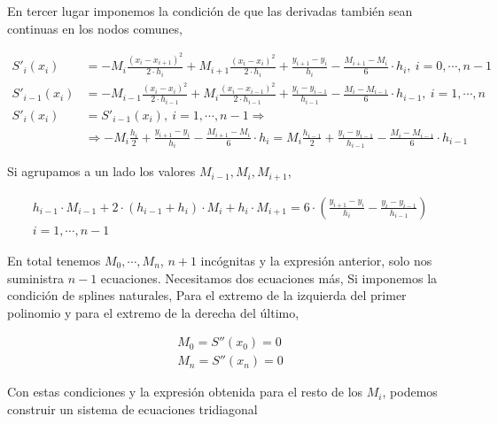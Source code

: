En tercer lugar imponemos la condición de que las derivadas también sean continuas en los nodos comunes,

\begin{align*}
S'_i(x_i)&=-M_i\frac{(x_i-x_{i+1})^2}{2\cdot h_i}+M_{i+1}\frac{(x_i-x_i)^2}{2\cdot h_i}+\frac{y_{i+1}-y_i}{h_i}-\frac{M_{i+1}-M_i}{6}\cdot h_i,\   i=0,\cdots, n-1\\
S'_{i-1}(x_i)&=-M_{i-1}\frac{(x_i-x_i)^2}{2\cdot h_{i-1}}+M_{i}\frac{(x_i-x_{i-1})^2}{2\cdot h_{i-1 }}+\frac{y_i-y_{i-1}}{h_{i-1}}-\frac{M_i-M_{i-1}}{6}\cdot h_{i-1},\   i=1,\cdots, n\\
S'_i(x_i)&=S'_{i-1}(x_i) ,\   i=1,\cdots, n-1 \Rightarrow\\
&\Rightarrow -M_i\frac{h_i}{2}+\frac{y_{i+1}-y_i}{h_i}-\frac{M_{i+1}-M_i}{6}\cdot h_i=M_{i}\frac{h_{i-1}}{2}+\frac{y_i-y_{i-1}}{h_{i-1}}-\frac{M_i-M_{i-1}}{6}\cdot h_{i-1}
\end{align*}

Si agrupamos a un lado los valores $M_{i-1}, M_i, M_{i+1}$,

\begin{align*}
h_{i-1}\cdot M_{i-1}+2\cdot (h_{i-1}+h_i)\cdot M_i+h_i\cdot M_{i+1}=6\cdot \left(\frac{y_{i+1}-y_i}{h_i}-\frac{y_i-y_{i-1}}{h_{i-1}}\right)\\
i=1,\cdots ,n-1
\end{align*}

En total tenemos $M_0,\cdots, M_n$, $n+1$ incógnitas y la expresión anterior, solo nos suministra $n-1$ ecuaciones. Necesitamos dos ecuaciones más, Si imponemos la condición de splines naturales, Para el extremo de la izquierda del primer polinomio y para el extremo de la derecha del último,

\begin{align*}
M_0=S''(x_0)=0\\
M_n=S''(x_n)=0
\end{align*}

Con estas condiciones y la expresión obtenida para el resto de los $M_i$, podemos construir un sistema de ecuaciones tridiagonal

